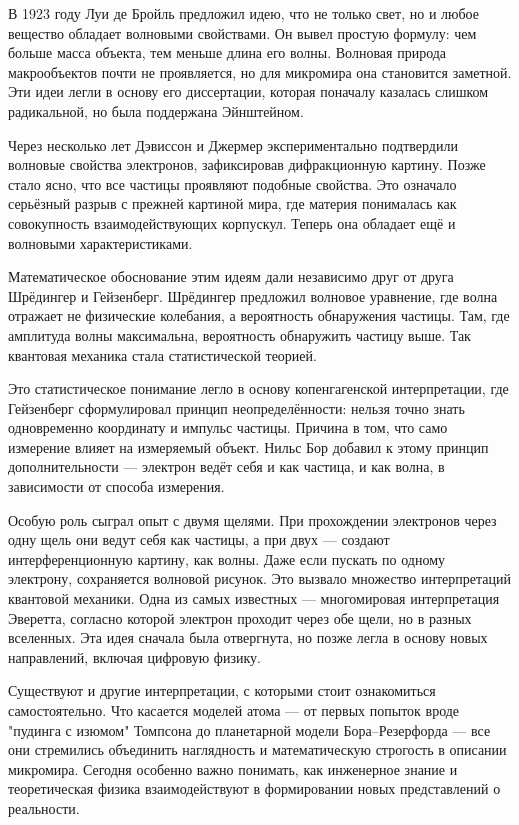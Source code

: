 В 1923 году Луи де Бройль предложил идею, что не только свет, но и любое вещество обладает волновыми свойствами. Он вывел простую формулу: чем больше масса объекта, тем меньше длина его волны. Волновая природа макрообъектов почти не проявляется, но для микромира она становится заметной. Эти идеи легли в основу его диссертации, которая поначалу казалась слишком радикальной, но была поддержана Эйнштейном.

Через несколько лет Дэвиссон и Джермер экспериментально подтвердили волновые свойства электронов, зафиксировав дифракционную картину. Позже стало ясно, что все частицы проявляют подобные свойства. Это означало серьёзный разрыв с прежней картиной мира, где материя понималась как совокупность взаимодействующих корпускул. Теперь она обладает ещё и волновыми характеристиками.

Математическое обоснование этим идеям дали независимо друг от друга Шрёдингер и Гейзенберг. Шрёдингер предложил волновое уравнение, где волна отражает не физические колебания, а вероятность обнаружения частицы. Там, где амплитуда волны максимальна, вероятность обнаружить частицу выше. Так квантовая механика стала статистической теорией.

Это статистическое понимание легло в основу копенгагенской интерпретации, где Гейзенберг сформулировал принцип неопределённости: нельзя точно знать одновременно координату и импульс частицы. Причина в том, что само измерение влияет на измеряемый объект. Нильс Бор добавил к этому принцип дополнительности --- электрон ведёт себя и как частица, и как волна, в зависимости от способа измерения.

Особую роль сыграл опыт с двумя щелями. При прохождении электронов через одну щель они ведут себя как частицы, а при двух --- создают интерференционную картину, как волны. Даже если пускать по одному электрону, сохраняется волновой рисунок. Это вызвало множество интерпретаций квантовой механики. Одна из самых известных --- многомировая интерпретация Эверетта, согласно которой электрон проходит через обе щели, но в разных вселенных. Эта идея сначала была отвергнута, но позже легла в основу новых направлений, включая цифровую физику.

Существуют и другие интерпретации, с которыми стоит ознакомиться самостоятельно. Что касается моделей атома --- от первых попыток вроде "пудинга с изюмом" Томпсона до планетарной модели Бора–Резерфорда --- все они стремились объединить наглядность и математическую строгость в описании микромира. Сегодня особенно важно понимать, как инженерное знание и теоретическая физика взаимодействуют в формировании новых представлений о реальности.

